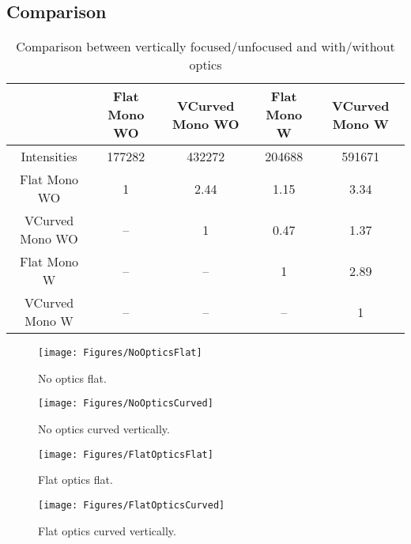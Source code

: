 \subsection{Comparison}
\begin{table}[H]
\begin{tabular}{|c|c|c|c|c|}\hline
 & Flat Mono WO & VCurved Mono WO  & Flat Mono W & VCurved Mono W\\ \hline
Intensities & 177282 & 432272 & 204688 & 591671 \\ \hline
Flat Mono WO & 1 & 2.44 & {\color{red}1.15} & 3.34 \\ \hline
VCurved Mono WO & -- & 1 & 0.47 & {\color{red}1.37} \\ \hline
Flat Mono W & -- & -- & 1 & 2.89 \\ \hline
VCurved Mono W & -- & -- & -- & 1 \\ \hline
\end{tabular}
\caption{Comparison between vertically focused/unfocused and with/without optics}
\end{table}

\begin{figure}[H]\centering
\texttt{[image: Figures/NoOpticsFlat]}\caption{No optics flat.}
\texttt{[image: Figures/NoOpticsCurved]}\caption{No optics curved vertically.}
\end{figure}
\begin{figure}[H]\centering
\texttt{[image: Figures/FlatOpticsFlat]}\caption{Flat optics flat.}
\texttt{[image: Figures/FlatOpticsCurved]}\caption{Flat optics curved vertically.}
\end{figure}

